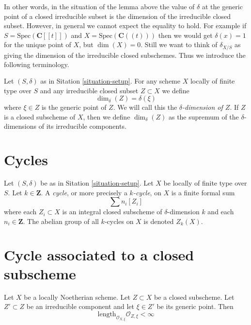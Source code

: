 \noindent
In other words, in the situation of the lemma above the
value of $\delta$ at the generic point of a closed irreducible subset
is the dimension of the irreducible closed subset.
However, in general we cannot expect the equality to hold.
For example if $S = \text{Spec}(\mathbf{C}[[t]])$ and
$X = \text{Spec}(\mathbf{C}((t)))$ then we would get
$\delta(x) = 1$ for the unique point of $X$, but $\dim(X) = 0$.
Still we want to think of $\delta_{X/S}$ as giving the
dimension of the irreducible closed subschemes. Thus we introduce
the following terminology.

\begin{definition}
\label{definition-delta-dimension}
Let $(S, \delta)$ as in Sitation \ref{situation-setup}.
For any scheme $X$ locally of finite type over $S$
and any irreducible closed subset $Z \subset X$ we define
$$
\dim_\delta(Z) = \delta(\xi)
$$
where $\xi \in Z$ is the generic point of $Z$.
We will call this the {\it $\delta$-dimension of $Z$}.
If $Z$ is a closed subscheme of $X$, then we define
$\dim_\delta(Z)$ as the supremum of the $\delta$-dimensions
of its irreducible components.
\end{definition}







\section{Cycles}
\label{section-cycles}

\begin{definition}
\label{definition-cycles}
Let $(S, \delta)$ be as in Sitation \ref{situation-setup}.
Let $X$ be locally of finite type over $S$.
Let $k \in \mathbf{Z}$.
A {\it cycle}, or more precisely a {\it $k$-cycle}, on $X$ is
a finite formal sum
$$
\sum n_i [Z_i]
$$
where each $Z_i \subset X$ is an integral closed subscheme
of $\delta$-dimension $k$ and each $n_i \in \mathbf{Z}$.
The abelian group of all $k$-cycles on $X$ is denoted $Z_k(X)$.
\end{definition}




\section{Cycle associated to a closed subscheme}
\label{section-cycle-of-closed-subscheme}

\begin{lemma}
\label{lemma-multiplicity-finite}
Let $X$ be a locally Noetherian scheme.
Let $Z \subset X$ be a closed subscheme.
Let $Z' \subset Z$ be an irreducible component and
let $\xi \in Z'$ be its generic point.
Then
$$
\text{length}_{\mathcal{O}_{X, \xi}} \mathcal{O}_{Z, \xi} < \infty
$$
\end{lemma}

